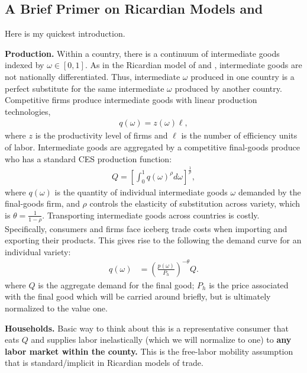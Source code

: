 \documentclass[pdftex,12pt]{article}
\begin{document}
\subsection{A Brief Primer on Ricardian Models and \citet{eaton2002technology}}

Here is my quickest introduction.

\medskip
\noindent \textbf{Production.} Within a country, there is a continuum of intermediate goods indexed by $\omega \in [0, 1]$. As in the Ricardian model of \citet{dornbusch1977comparative} and \citet{eaton2002technology}, intermediate goods are not nationally differentiated. Thus, intermediate $\omega$ produced in one country is a perfect substitute for the same intermediate $\omega$ produced by another country. Competitive firms produce intermediate goods with linear production technologies,
\begin{align}
q(\omega) = z(\omega) \ell,
\end{align}
where $z$ is the productivity level of firms and $\ell$ is the number of efficiency units of labor. Intermediate goods are aggregated by a competitive final-goods produce who has a standard CES production function:
\begin{align}
Q = \left[ \int_0^1 q(\omega)^\rho d\omega \right]^{\frac{1}{\rho}},
\label{eq:ces}
\end{align}
where $q(\omega)$ is the quantity of individual intermediate goods $\omega$ demanded by the final-goods firm, and $\rho$ controls the elasticity of substitution across variety, which is $\theta = \frac{1}{1-\rho}$. Transporting intermediate goods across countries is costly. Specifically, consumers and firms face iceberg trade costs when importing and exporting their products. This gives rise to the following the demand curve for an individual variety:
\begin{align}
q(\omega) & = \left(\frac{p(\omega)}{P_h}\right)^{-\theta}Q.
\label{eq:demand_curve}
\end{align}
where $Q$ is the aggregate demand for the final good; $P_h$ is the price associated with the final good which will be carried around briefly, but is ultimately normalized to the value one.

\medskip
\noindent \textbf{Households.} Basic way to think about this is a representative consumer that eats $Q$ and supplies labor inelastically (which we will normalize to one) to \textbf{any labor market within the county.} This is the free-labor mobility assumption that is standard/implicit in Ricardian models of trade.
\end{document}

